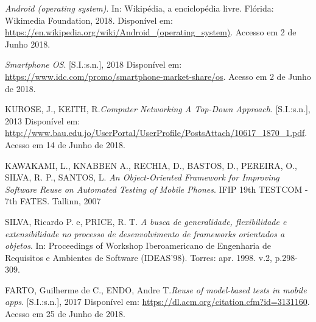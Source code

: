 \documentclass[
    12pt,       %
    openright,      %
    twoside,      %
    a4paper,      %
    english,      %
    french,       %
    spanish,      %
    brazil,       %
    ]{abntex2}
\begin{document}
  \noindent
  \textit{Android (operating system)}. In: Wikipédia, a enciclopédia livre. Flórida: Wikimedia Foundation,
  2018. Disponível em:
  \url{https://en.wikipedia.org/wiki/Android_(operating_system)}. Accesso
  em 2 de Junho 2018.

  \noindent
  \textit{Smartphone OS}. [S.I.:s.n.], 2018 Disponível em: \url{https://www.idc.com/promo/smartphone-market-share/os}.
  Acesso em 2 de Junho de 2018.

  \noindent
  KUROSE, J., KEITH, R.\textit{Computer Networking A Top-Down Approach}. [S.I.:s.n.], 2013 Disponível em: \url{http://www.bau.edu.jo/UserPortal/UserProfile/PostsAttach/10617_1870_1.pdf}. Acesso em 14 de Junho de 2018.

  \noindent
  KAWAKAMI, L., KNABBEN A., RECHIA, D., BASTOS, D., PEREIRA, O., SILVA, R. P., SANTOS, L. \textit{An Object-Oriented Framework for Improving Software Reuse on Automated Testing of Mobile Phones}. IFIP 19th TESTCOM - 7th FATES. Tallinn, 2007

  \noindent
  SILVA, Ricardo P. e, PRICE, R. T. \textit{A busca de generalidade, flexibilidade e extensibilidade no processo de desenvolvimento de frameworks orientados a objetos}.
  In: Proceedings of Workshop Iberoamericano de Engenharia de Requisitos e Ambientes de Software (IDEAS'98). Torres: apr. 1998. v.2, p.298-309.

  \noindent
  FARTO, Guilherme de C., ENDO, Andre T.\textit{Reuse of model-based tests in mobile apps}. [S.I.:s.n.], 2017 Disponível em: \url{https://dl.acm.org/citation.cfm?id=3131160}. Acesso em 25 de Junho de 2018.





\end{document}
